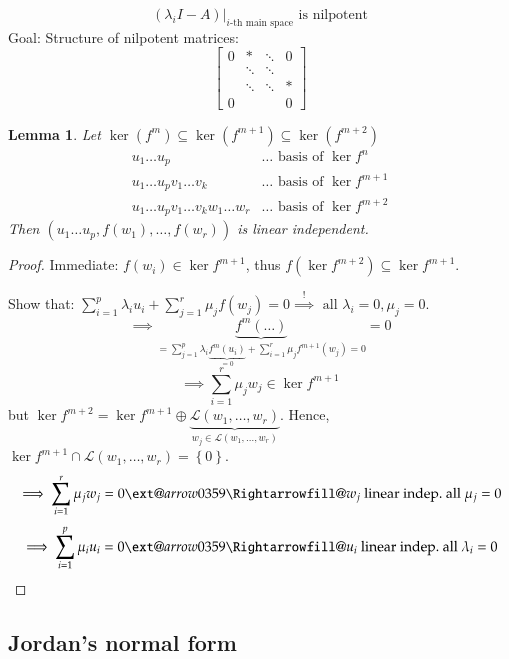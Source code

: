 \documentclass{article}
\makeatletter
\newtheorem{lemma}{Lemma}  \numberwithin{lemma}{section}
\newcommand{\set}[1]{\left\{#1\right\}}
\newcommand{\xRightarrow}[2][]{\ext@arrow 0359\Rightarrowfill@{#1}{#2}}
\makeatother
\begin{document}
\[ (\lambda_i I - A)|_{i\text{-th main space}} \text{ is nilpotent} \]
Goal: Structure of nilpotent matrices:
\[
  \begin{bmatrix}
    0 & * & \ddots & 0 \\
      & \ddots & \ddots & \\
      & \ddots & \ddots & * \\
    0 &  & & 0
  \end{bmatrix}
\]

\begin{lemma} %
  \label{lemma1117}
  Let $\ker(f^m) \subseteq \ker(f^{m+1}) \subseteq \ker(f^{m+2})$
  \begin{align*}
    u_1 \dots u_p & \dots \text{ basis of } \ker{f^n} \\
    u_1 \dots u_p v_1 \dots v_k & \dots \text{ basis of } \ker{f^{m+1}} \\
    u_1 \dots u_p v_1 \dots v_k w_1 \dots w_r & \dots \text{ basis of } \ker{f^{m+2}}
  \end{align*}
  Then $(u_1 \dots u_p, f(w_1), \dots, f(w_r))$ is linear independent.
\end{lemma}

\begin{proof}
  Immediate: $f(w_i) \in \ker{f^{m+1}}$, thus $f(\ker{f^{m+2}}) \subseteq \ker{f^{m+1}}$.

  Show that: $\sum_{i=1}^p \lambda_i u_i + \sum_{j=1}^r \mu_j f(w_j) = 0 \overset!\implies \text{ all } \lambda_i = 0, \mu_j = 0$.
  \[ \implies \underbrace{f^m(\dots)}_{= \sum_{j=1}^p \lambda_i \underbrace{f^m(u_i)}_{=0} + \sum_{i=1}^r \mu_j f^{m+1}(w_j) = 0} = 0 \]
  \[ \implies \sum_{i=1}^r \mu_j w_j \in \ker{f^{m+1}} \]
  but $\ker{f^{m+2}} = \ker{f^{m+1}} \oplus \underbrace{\mathcal L(w_1, \dots, w_r)}_{w_j \in \mathcal L(w_1, \dots, w_r)}$.
  Hence, $\ker{f^{m+1}} \cap \mathcal L(w_1, \dots, w_r) = \set{0}$.
  \[ \implies \sum_{i=1}^r \mu_j w_j = 0 \xRightarrow{w_j \text{ linear indep.}} \text{ all } \mu_j = 0 \]
  \[ \implies \sum_{i=1}^p \mu_i u_i = 0 \xRightarrow{u_i \text{ linear indep.}} \text{ all } \lambda_i = 0 \]
\end{proof}

\subsection{Jordan's normal form}
\end{document}
